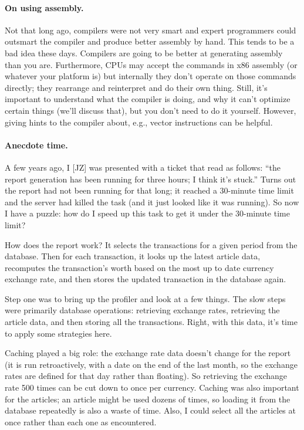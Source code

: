 \paragraph{On using assembly.} Not that long ago, compilers were not very smart and expert programmers could outsmart the compiler and produce better assembly by hand. This tends to be a bad idea these days. Compilers are going to be better at generating assembly than you are. Furthermore, CPUs may accept the commands in x86 assembly (or whatever your platform is) but internally they don't operate on those commands directly; they rearrange and reinterpret and do their own thing. Still, it's important to understand what the compiler is doing, and why it can't optimize certain things (we'll discuss that), but you don't need to do it yourself. However, giving hints to the compiler about, e.g., vector instructions can be helpful.

\paragraph{Anecdote time.} A few years ago, I [JZ] was presented with a ticket that read as follows: ``the report generation has been running for three hours; I think it's stuck.'' Turns out the report had not been running for that long; it reached a 30-minute time limit and the server had killed the task (and it just looked like it was running). So now I have a puzzle: how do I speed up this task to get it under the 30-minute time limit?

How does the report work? It selects the transactions for a given period from the database. Then for each transaction, it looks up the latest article data, recomputes the transaction's worth based on the most up to date currency exchange rate, and then stores the updated transaction in the database again.

Step one was to bring up the profiler and look at a few things. The slow steps were primarily database operations: retrieving exchange rates, retrieving the article data, and then storing all the transactions. Right, with this data, it's time to apply some strategies here.

Caching played a big role: the exchange rate data doesn't change for the report (it is run retroactively, with a date on the end of the last month, so the exchange rates are defined for that day rather than floating). So retrieving the exchange rate 500 times can be cut down to once per currency. Caching was also important for the articles; an article might be used dozens of times, so loading it from the database repeatedly is also a waste of time. Also, I could select all the articles at once rather than each one as encountered.

